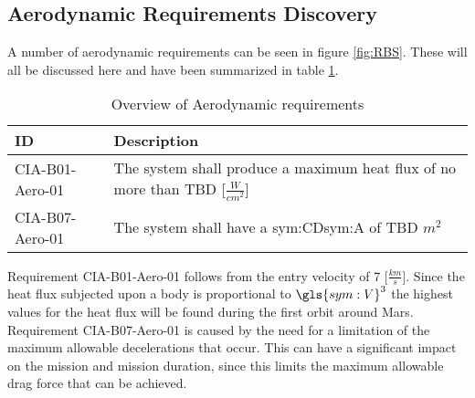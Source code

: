 \subsection{Aerodynamic Requirements Discovery} 
\label{sec:aero}
A number of aerodynamic requirements can be seen in figure \ref{fig:RBS}. These will all be discussed here and have been summarized in table \ref{tab:aeroreqs}. 


\begin{table}[h]
	\caption{Overview of Aerodynamic requirements}
	\label{tab:aeroreqs}
	\begin{tabular}{|p{}|p{}|}
		\hline
		ID & Description \\
		\hline \hline
		CIA-B01-Aero-01 & The system shall produce a maximum heat flux of no more than TBD [$\frac{W}{cm^{2}}$] \\ \hline
		CIA-B07-Aero-01 & The system shall have a \gls{sym:CD}\gls{sym:A} of TBD $m^{2}$ \\ \hline
	\end{tabular}
\end{table}

Requirement CIA-B01-Aero-01 follows from the entry velocity of 7 [$\frac{km}{s}$]. Since the heat flux subjected upon a body is proportional to $\gls{sym:V}^{3}$ \cite{Tauber1986} the highest values for the heat flux will be found during the first orbit around Mars. 
Requirement CIA-B07-Aero-01 is caused by the need for a limitation of the maximum allowable decelerations that occur. This can have a significant impact on the mission and mission duration, since this limits the maximum allowable drag force that can be achieved.